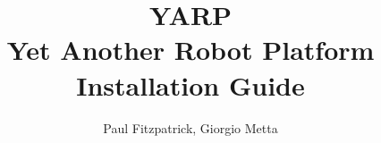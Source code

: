 \documentclass[a4paper]{article}
\begin{document}
\title{{\LARGE YARP}\\Yet Another Robot Platform\\
Installation Guide
}


\author{Paul Fitzpatrick, Giorgio Metta}

\maketitle




\newpage



\newpage



%

%

%

\newpage



\end{document}
